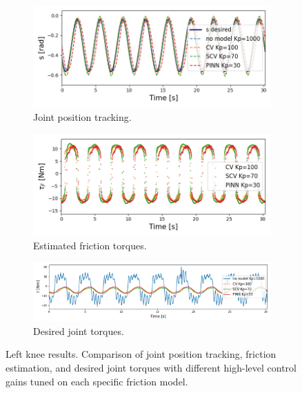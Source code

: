 \begin{figure}[t]
\centering
\begin{subfigure}{.49\textwidth}
  \includegraphics[width=0.98\linewidth,center]{figures/knee_sinusoid_tracking_highkp.png}
  \vspace{-20pt}
  \caption{Joint position tracking.}
  \label{fig:trackingknee}
\end{subfigure}%
\hspace{\fill} %
\begin{subfigure}{.49\textwidth}
  \includegraphics[width=0.98\linewidth,center]{figures/knee_friction_highkp.png}
  \vspace{-20pt}
  \caption{Estimated friction torques.}
  \label{fig:frictionknee}
\end{subfigure}
\begin{subfigure}{.98\textwidth}
  \includegraphics[width=0.9\linewidth,center]{figures/knee_torque_sinusoid_tracking_highkp.png}
  \vspace{-20pt}
  \caption{Desired joint torques.}
  \label{fig:torqueknee}
\end{subfigure}
\vspace{-5pt}
\caption{Left knee results. Comparison of joint position tracking, friction estimation, and desired joint torques with different high-level control gains tuned on each specific friction model.}
\vspace{-10pt}
\end{figure}
